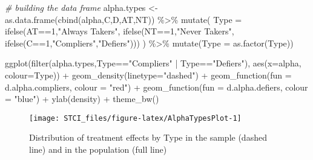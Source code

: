 \documentclass[
]{book}
\newenvironment{Shaded}{\begin{snugshade}}{\end{snugshade}}
\newcommand{\AttributeTok}[1]{\textcolor[rgb]{0.77,0.63,0.00}{#1}}
\newcommand{\CommentTok}[1]{\textcolor[rgb]{0.56,0.35,0.01}{\textit{#1}}}
\newcommand{\DecValTok}[1]{\textcolor[rgb]{0.00,0.00,0.81}{#1}}
\newcommand{\FunctionTok}[1]{\textcolor[rgb]{0.00,0.00,0.00}{#1}}
\newcommand{\NormalTok}[1]{#1}
\newcommand{\OtherTok}[1]{\textcolor[rgb]{0.56,0.35,0.01}{#1}}
\newcommand{\SpecialCharTok}[1]{\textcolor[rgb]{0.00,0.00,0.00}{#1}}
\newcommand{\StringTok}[1]{\textcolor[rgb]{0.31,0.60,0.02}{#1}}
\theoremstyle{definition}
\theoremstyle{definition}
\theoremstyle{definition}
\theoremstyle{definition}
\theoremstyle{remark}
\begin{document}
\begin{Shaded}
\begin{Highlighting}[]
\CommentTok{\# building the data frame}
\NormalTok{alpha.types }\OtherTok{\textless{}{-}} \FunctionTok{as.data.frame}\NormalTok{(}\FunctionTok{cbind}\NormalTok{(alpha,C,D,AT,NT)) }\SpecialCharTok{\%\textgreater{}\%}
                \FunctionTok{mutate}\NormalTok{(}
                  \AttributeTok{Type =} \FunctionTok{ifelse}\NormalTok{(AT}\SpecialCharTok{==}\DecValTok{1}\NormalTok{,}\StringTok{"Always Takers"}\NormalTok{,}
                                \FunctionTok{ifelse}\NormalTok{(NT}\SpecialCharTok{==}\DecValTok{1}\NormalTok{,}\StringTok{"Never Takers"}\NormalTok{,}
                                       \FunctionTok{ifelse}\NormalTok{(C}\SpecialCharTok{==}\DecValTok{1}\NormalTok{,}\StringTok{"Compliers"}\NormalTok{,}\StringTok{"Defiers"}\NormalTok{)))}
\NormalTok{                ) }\SpecialCharTok{\%\textgreater{}\%}
                \FunctionTok{mutate}\NormalTok{(}\AttributeTok{Type =} \FunctionTok{as.factor}\NormalTok{(Type))}

\FunctionTok{ggplot}\NormalTok{(}\FunctionTok{filter}\NormalTok{(alpha.types,Type}\SpecialCharTok{==}\StringTok{"Compliers"} \SpecialCharTok{|}\NormalTok{ Type}\SpecialCharTok{==}\StringTok{"Defiers"}\NormalTok{), }\FunctionTok{aes}\NormalTok{(}\AttributeTok{x=}\NormalTok{alpha, }\AttributeTok{colour=}\NormalTok{Type)) }\SpecialCharTok{+} 
  \FunctionTok{geom\_density}\NormalTok{(}\AttributeTok{linetype=}\StringTok{"dashed"}\NormalTok{) }\SpecialCharTok{+}
  \FunctionTok{geom\_function}\NormalTok{(}\AttributeTok{fun =}\NormalTok{ d.alpha.compliers, }\AttributeTok{colour =} \StringTok{"red"}\NormalTok{) }\SpecialCharTok{+}
  \FunctionTok{geom\_function}\NormalTok{(}\AttributeTok{fun =}\NormalTok{ d.alpha.defiers, }\AttributeTok{colour =} \StringTok{"blue"}\NormalTok{) }\SpecialCharTok{+}
  \FunctionTok{ylab}\NormalTok{(}\StringTok{\textquotesingle{}density\textquotesingle{}}\NormalTok{) }\SpecialCharTok{+}
  \FunctionTok{theme\_bw}\NormalTok{()}
\end{Highlighting}
\end{Shaded}

\begin{figure}[htbp]

{\centering \texttt{[image: STCI\_files/figure-latex/AlphaTypesPlot-1]} 

}

\caption{Distribution of treatment effects by Type in the sample (dashed line) and in the population (full line)}\label{fig:AlphaTypesPlot}
\end{figure}
\end{document}
